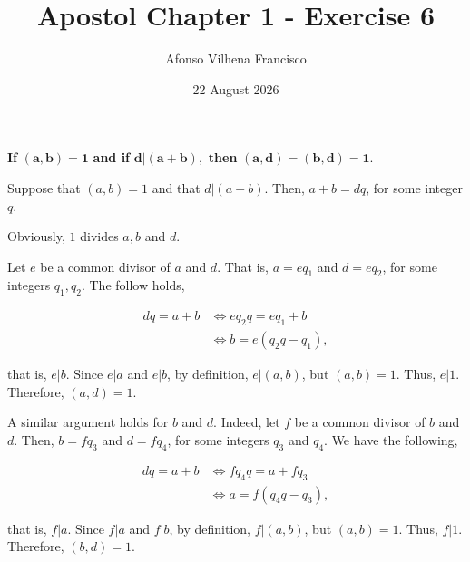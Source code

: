 \documentclass{article}
\title{Apostol Chapter 1 - Exercise 6}
\author{Afonso Vilhena Francisco }
\date{22 August 2026}
\begin{document}
\maketitle

\textbf{If} $\mathbf{(a,b)=1}$ \textbf{and if} $\mathbf{d|(a+b)},$ \textbf{then} $\mathbf{(a,d)=(b,d)=1.}$

\vspace{0.5cm}

Suppose that $(a,b)=1$ and that $d|(a+b)$. Then, $a+b=dq$, for some integer $q$.

Obviously, $1$ divides $a,b$ and $d$.

Let $e$ be a common divisor of $a$ and $d$. That is, $a=eq_1$ and $d=eq_2$, for some integers $q_1,q_2$. The  follow holds,

\begin{align*}
    dq = a+b &\Leftrightarrow eq_2q = eq_1+b\\
             &\Leftrightarrow b=e(q_2q-q_1),
\end{align*}

that is, $e|b$. Since $e|a$ and $e|b$, by definition, $e|(a,b)$, but $(a,b)=1$. Thus, $e|1$. Therefore, $(a,d)=1.$

A similar argument holds for $b$ and $d$. Indeed, let $f$ be a common divisor of $b$ and $d$. Then, $b=fq_3$ and $d=fq_4$, for some integers $q_3$ and $q_4$. We have the following,

\begin{align*}
    dq = a+b &\Leftrightarrow fq_4q = a+fq_3\\
             &\Leftrightarrow a = f(q_4q-q_3),
\end{align*}

that is, $f|a$. Since $f|a$ and $f|b$, by definition, $f|(a,b)$, but $(a,b)=1$. Thus, $f|1$. Therefore, $(b,d)=1$.
\end{document}
